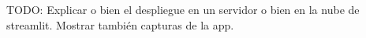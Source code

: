 TODO: Explicar o bien el despliegue en un servidor o bien en la nube de streamlit. Mostrar también capturas de la app.

%
